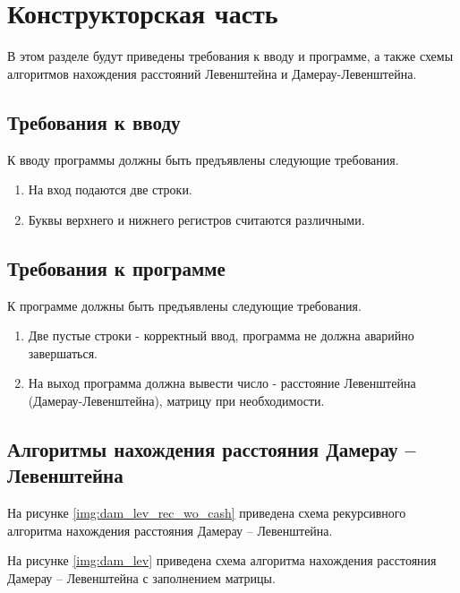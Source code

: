 \chapter{Конструкторская часть}
В этом разделе будут приведены требования к вводу и программе, а также схемы алгоритмов нахождения расстояний Левенштейна и Дамерау-Левенштейна.

\section{Требования к вводу}
К вводу программы должны быть предъявлены следующие требования.
\begin{enumerate}
	\item На вход подаются две строки.
	\item Буквы верхнего и нижнего регистров считаются различными.
\end{enumerate}

\section{Требования к программе}
К программе должны быть предъявлены следующие требования.
\begin{enumerate}
	\item Две пустые строки - корректный ввод, программа не должна аварийно завершаться.
	\item На выход программа должна вывести число - расстояние Левенштейна (Дамерау-Левенштейна), матрицу при необходимости.
\end{enumerate}

\section{Алгоритмы нахождения расстояния Дамерау -- Левенштейна}

На рисунке \ref{img:dam_lev_rec_wo_cash} приведена схема рекурсивного алгоритма нахождения расстояния Дамерау -- Левенштейна.


\FloatBarrier

На рисунке \ref{img:dam_lev} приведена схема алгоритма нахождения расстояния Дамерау -- Левенштейна с заполнением матрицы.


